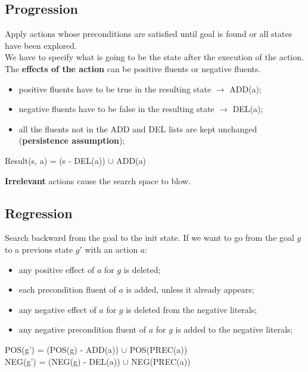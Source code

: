 \documentclass{article}
\begin{document}
\newpage

\subsection{Progression}

Apply actions whose preconditions are satisfied until goal is found or all states have been explored. \\

We have to specify what is going to be the state after the execution of the action. The \textbf{effects of the action} can be positive fluents or negative fluents. 

\begin{itemize}
    \item positive fluents have to be true in the resulting state $\rightarrow$ ADD(a);
    \item negative fluents have to be false in the resulting state $\rightarrow$ DEL(a);
    \item all the fluents not in the ADD and DEL lists are kept unchanged (\textbf{persistence assumption});
\end{itemize}

\begin{center}
    Result(s, a) = (s - DEL(a)) $\cup$ ADD(a)
\end{center}

\textbf{Irrelevant} actions cause the search space to blow.

\subsection{Regression}

Search backward from the goal to the init state. If we want to go from the goal $g$ to a previous state $g'$ with an action $a$:

\begin{itemize}
    \item any positive effect of $a$ for $g$ is deleted;
    \item each precondition fluent of $a$ is added, unless it already appears;
    \item any negative effect of $a$ for $g$ is deleted from the negative literals;
    \item any negative precondition fluent of $a$ for $g$ is added to the negative literals;
\end{itemize}

\begin{center}
    POS(g') = (POS(g) - ADD(a)) $\cup$ POS(PREC(a)) \\
    NEG(g') = (NEG(g) - DEL(a)) $\cup$ NEG(PREC(a))
\end{center}
\end{document}
